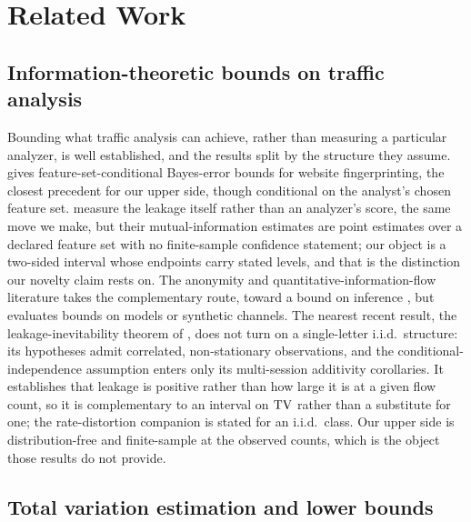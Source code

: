 \section{Related Work}
\label{sec:related}

\subsection{Information-theoretic bounds on traffic analysis}
\label{sec:related/bounds}

Bounding what traffic analysis can achieve, rather than measuring a particular
analyzer, is well established, and the results split by the structure they
assume. \citet{cherubin2017bayes} gives feature-set-conditional Bayes-error
bounds for website fingerprinting, the closest precedent for our upper side,
though conditional on the analyst's chosen feature set.
\citet{li2018measuring} measure the leakage itself rather than an analyzer's
score, the same move we make, but their mutual-information estimates are point
estimates over a declared feature set with no finite-sample confidence statement;
our object is a two-sided interval whose endpoints carry stated levels, and that
is the distinction our novelty claim rests on. The anonymity and
quantitative-information-flow literature takes the complementary route, toward a
bound on inference
\citep{serjantov2003metric,ghaderi2010anonymous,venkitasubramaniam2008eavesdroppers,venkitasubramaniam2008chaum,chatzikokolakis2007error,chatzikokolakis2008noisy},
but evaluates bounds on models or synthetic channels. The nearest recent result, the
leakage-inevitability theorem of \citet{liu2026inevitability}, does not turn on a
single-letter i.i.d.\ structure: its hypotheses admit correlated, non-stationary
observations, and the conditional-independence assumption enters only its
multi-session additivity corollaries. It establishes that leakage is positive
rather than how large it is at a given flow count, so it is complementary to an
interval on $\mathrm{TV}$ rather than a substitute for one; the rate-distortion
companion \citep{liu2026rate} is stated for an i.i.d.\ class. Our upper side is
distribution-free and finite-sample at the observed counts, which is the object
those results do not provide.

\subsection{Total variation estimation and lower bounds}
\label{sec:related/tv}

